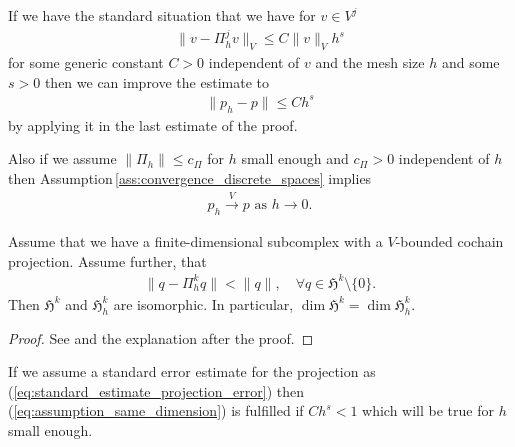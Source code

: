 \documentclass[../master_thesis.tex]{subfiles}
\begin{document}
If we have the standard situation that 
we have for $v \in V^j$
\begin{align}
    \lVert v - \Pi^j_h v \rVert _V \leq C \lVert v  \rVert _V h^s \label{eq:standard_estimate_projection_error}
\end{align}
for some generic constant $C>0$ independent of $v$ and the mesh size $h$ and some 
$s>0$ then we can improve the estimate to
\begin{align*}
    \lVert p_h - p \rVert \leq C h^s
\end{align*}
by applying it in the last estimate of the proof.

Also if we assume $\lVert \Pi_h \rVert \leq c_\Pi$ for $h$ small enough and 
$c_\Pi > 0 $ independent of $h$ then Assumption\,\ref{ass:convergence_discrete_spaces} implies
\begin{align*}
    p_h \xrightarrow{V} p \text{ as } h \rightarrow 0.
\end{align*}

\begin{theorem}\label{thm:dim_of_discrete_harmonic_space}
    Assume that we have a finite-dimensional subcomplex
    with a $V$-bounded cochain projection. Assume further, that 
    \begin{align}
        \lVert q - \Pi_h^k q \rVert < \lVert q \rVert, \quad \forall q \in \mathfrak{H}^k\setminus \{0\}.
        \label{eq:assumption_same_dimension}
    \end{align}
    Then $\mathfrak{H}^k$ and $\mathfrak{H}^k_h$ are isomorphic. 
    In particular, $\dim \mathfrak{H}^k = \dim \mathfrak{H}^k_h$.
\end{theorem}
\begin{proof}
    See \cite[Thm\,5.1]{arnold} and the explanation after the proof.
\end{proof}
If we assume a standard error estimate for the projection as (\ref{eq:standard_estimate_projection_error})
then (\ref{eq:assumption_same_dimension}) is fulfilled if $C h^s < 1$ which will be true 
for $h$ small enough.
\end{document}
